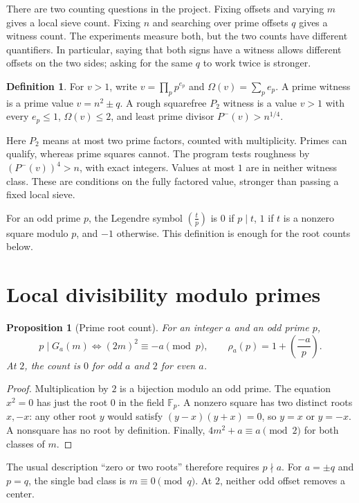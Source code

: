 \documentclass[11pt]{article}
\newtheorem{proposition}[theorem]{Proposition}
\theoremstyle{definition}
\newtheorem{definition}[theorem]{Definition}
\theoremstyle{remark}
\newcommand{\leg}[2]{\left(\frac{#1}{#2}\right)}
\begin{document}
There are two counting questions in the project. Fixing offsets and
varying $m$ gives a local sieve count. Fixing $n$ and searching over
prime offsets $q$ gives a witness count. The experiments measure both,
but the two counts have different quantifiers. In particular, saying
that both signs have a witness allows different offsets on the two
sides; asking for the same $q$ to work twice is stronger.

\begin{definition}
For $v>1$, write $v=\prod_p p^{e_p}$ and $\Omega(v)=\sum_p e_p$.
A prime witness is a prime value $v=n^2\pm q$. A rough squarefree
$P_2$ witness is a value $v>1$ with every $e_p\le1$,
$\Omega(v)\le2$, and least prime divisor $P^-(v)>n^{1/4}$.
\end{definition}

Here $P_2$ means at most two prime factors, counted with multiplicity.
Primes can qualify, whereas prime squares cannot. The program tests
roughness by $(P^-(v))^4>n$, with exact integers. Values at most $1$
are in neither witness class. These are conditions on the fully
factored value, stronger than passing a fixed local sieve.

For an odd prime $p$, the Legendre symbol $\leg{t}{p}$ is $0$ if
$p\mid t$, $1$ if $t$ is a nonzero square modulo $p$, and $-1$
otherwise. This definition is enough for the root counts below.

\section{Local divisibility modulo primes}
\begin{proposition}[Prime root count]\label{prop:roots}
For an integer $a$ and an odd prime $p$,
\[
 p\mid G_a(m)\iff (2m)^2\equiv-a\pmod p,
 \qquad \rho_a(p)=1+\leg{-a}{p}.
\]
At $2$, the count is $0$ for odd $a$ and $2$ for even $a$.
\end{proposition}
\begin{proof}
Multiplication by $2$ is a bijection modulo an odd prime.
The equation $x^2=0$ has just the root $0$ in the field $\mathbb F_p$.
A nonzero square has two distinct roots $x,-x$: any other root $y$
would satisfy $(y-x)(y+x)=0$, so $y=x$ or $y=-x$.
A nonsquare has no root by definition. Finally,
$4m^2+a\equiv a\pmod2$ for both classes of $m$.
\end{proof}

The usual description ``zero or two roots'' therefore requires
$p\nmid a$. For $a=\pm q$ and $p=q$, the single bad class is
$m\equiv0\pmod q$. At $2$, neither odd offset removes a center.
\end{document}
